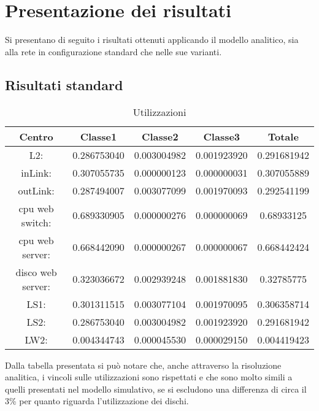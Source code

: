 \section{Presentazione dei risultati}
Si presentano di seguito i risultati ottenuti applicando il modello analitico, sia alla rete in configurazione standard che nelle sue varianti.
\subsection{Risultati standard}
\begin{table}[H]
\begin{center}
\begin{tabular}{||c|c|c|c|c||}
\hline
Centro &Classe1 &Classe2 &Classe3 &Totale\\
\hline
\hline
L2: &0.286753040 &0.003004982 &0.001923920 &0.291681942\\
\hline
inLink: &0.307055735 &0.000000123 &0.000000031 &0.307055889\\
\hline
outLink: &0.287494007 &0.003077099 &0.001970093 &0.292541199\\
\hline
cpu web switch: &0.689330905 &0.000000276 &0.000000069 &0.68933125\\
\hline
cpu web server: &0.668442090 &0.000000267 &0.000000067 &0.668442424\\
\hline
disco web server: &0.323036672 &0.002939248 &0.001881830 &0.32785775\\
\hline
LS1: &0.301311515 &0.003077104 &0.001970095 &0.306358714\\
\hline
LS2: &0.286753040 &0.003004982 &0.001923920 &0.291681942\\
\hline
LW2: &0.004344743 &0.000045530 &0.000029150 &0.004419423\\
\hline
\end{tabular}
\end{center}
\caption{Utilizzazioni}
\label{utilizzazioni}
\end{table}
Dalla tabella presentata si può notare che, anche attraverso la risoluzione analitica, i vincoli sulle utilizzazioni sono rispettati e che sono molto simili a quelli presentati nel modello simulativo, se si escludono una differenza di circa il 3\% per quanto riguarda l'utilizzazione dei dischi.
